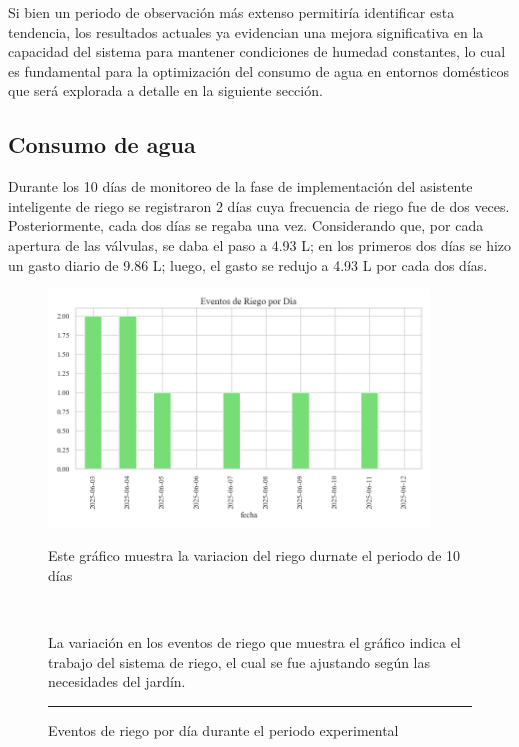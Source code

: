 \documentclass[pdflatex,sn-mathphys-num]{sn-jnl}%
\theoremstyle{thmstyleone}%
\theoremstyle{thmstyletwo}%
\theoremstyle{thmstylethree}%
\begin{document}
\begin{multicols}{2}

Si bien un periodo de observación más extenso permitiría identificar esta tendencia, los resultados actuales ya evidencian una mejora significativa en la capacidad del sistema para mantener condiciones de humedad constantes, lo cual es fundamental para la optimización del consumo de agua en entornos domésticos que será explorada a detalle en la siguiente sección.

\subsection*{Consumo de agua}
Durante los 10 días de monitoreo de la fase de implementación del asistente inteligente de riego se registraron 2 días cuya frecuencia de riego fue de dos veces. Posteriormente, cada dos días se regaba una vez. 
Considerando que, por cada apertura de las válvulas, se daba el paso a 4.93 L; en los primeros dos días se hizo un gasto diario de 9.86 L; luego, el gasto se redujo a 4.93 L por cada dos días. 

\end{multicols}

\begin{figure}[H]
    \centering
    \includegraphics[width=0.9\textwidth]{assets/eventos_por_dia.png}

    \caption{Eventos de riego por día durante el periodo experimental}
    \label{fig:riego}

    \vspace{0.4cm}

    \noindent
    \begin{minipage}[t]{0.5\textwidth}
        \raggedright
        Este gráfico muestra la variacion del riego durnate el periodo de 10 días

        \
    \end{minipage}%
    \hfill
    \begin{minipage}[t]{0.5\textwidth}
        \justifying
           La variación en los eventos de riego que muestra el gráfico indica el trabajo del sistema de riego, el cual se fue ajustando según las necesidades del jardín.
    \end{minipage}

    \vspace{0.5cm}
    \hrule
\end{figure}
\end{document}

